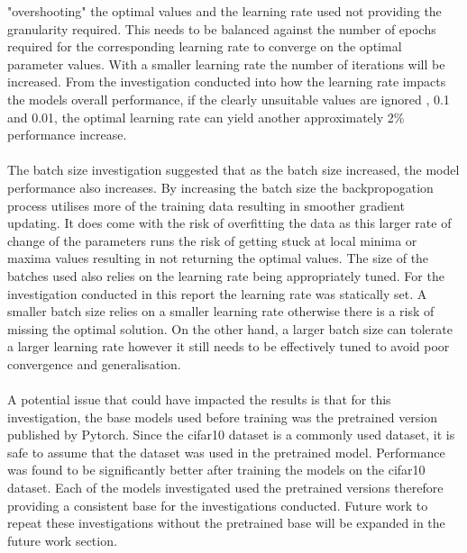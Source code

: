 \documentclass[10pt,twocolumn,letterpaper]{article}
\begin{document}
"overshooting" the optimal values and the learning rate used not providing the granularity
required. This needs to be balanced against the number of epochs required for the 
corresponding learning rate to converge on the optimal parameter values. With a smaller 
learning rate the number of iterations will be increased. From the investigation 
conducted into how the learning rate impacts the models overall performance, if the 
clearly unsuitable values are ignored , 0.1 and 0.01, the optimal learning rate can yield 
another approximately 2\% performance increase. 
\\
\\
The batch size investigation suggested that as the batch size increased, the model 
performance also increases. By increasing the batch size the backpropogation process 
utilises more of the training data resulting in smoother gradient updating. It does 
come with the risk of overfitting the data as this larger rate of change of the parameters 
runs the risk of getting stuck at local minima or maxima values resulting in not returning 
the optimal values. The size of the batches used also relies on the learning rate being 
appropriately tuned. For the investigation conducted in this report the learning rate 
was statically set. A smaller batch size relies on a smaller learning rate otherwise 
there is a risk of missing the optimal solution. On the other hand, a larger batch 
size can tolerate a larger learning rate however it still needs to be effectively tuned 
to avoid poor convergence and generalisation.
\\
\\
A potential issue that could have impacted the results is that for this investigation, 
the base models used before training was the pretrained version published by Pytorch.
Since the cifar10 dataset is a commonly used dataset, it is safe to assume that the 
dataset was used in the pretrained model. Performance was found to be significantly 
better after training the models on the cifar10 dataset. Each of the models investigated 
used the pretrained versions therefore providing a consistent base for the investigations 
conducted. Future work to repeat these investigations without the pretrained base will 
be expanded in the future work section. 
\end{document}
